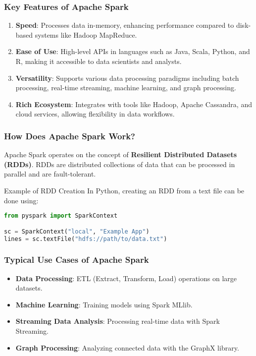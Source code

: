 \documentclass{beamer}
\begin{document}
\begin{frame}[fragile]
    \frametitle{Key Features of Apache Spark}
    \begin{enumerate}
        \item \textbf{Speed}: Processes data in-memory, enhancing performance compared to disk-based systems like Hadoop MapReduce.
        
        \item \textbf{Ease of Use}: High-level APIs in languages such as Java, Scala, Python, and R, making it accessible to data scientists and analysts.
        
        \item \textbf{Versatility}: Supports various data processing paradigms including batch processing, real-time streaming, machine learning, and graph processing.
        
        \item \textbf{Rich Ecosystem}: Integrates with tools like Hadoop, Apache Cassandra, and cloud services, allowing flexibility in data workflows.
    \end{enumerate}
\end{frame}

\begin{frame}[fragile]
    \frametitle{How Does Apache Spark Work?}
    Apache Spark operates on the concept of \textbf{Resilient Distributed Datasets (RDDs)}. 
    RDDs are distributed collections of data that can be processed in parallel and are fault-tolerant.

    \begin{block}{Example of RDD Creation}
    In Python, creating an RDD from a text file can be done using:
    \begin{lstlisting}[language=Python]
from pyspark import SparkContext

sc = SparkContext("local", "Example App")
lines = sc.textFile("hdfs://path/to/data.txt")
    \end{lstlisting}
    \end{block}
\end{frame}

\begin{frame}[fragile]
    \frametitle{Typical Use Cases of Apache Spark}
    \begin{itemize}
        \item \textbf{Data Processing}: ETL (Extract, Transform, Load) operations on large datasets.
        \item \textbf{Machine Learning}: Training models using Spark MLlib.
        \item \textbf{Streaming Data Analysis}: Processing real-time data with Spark Streaming.
        \item \textbf{Graph Processing}: Analyzing connected data with the GraphX library.
    \end{itemize}
\end{frame}
\end{document}
